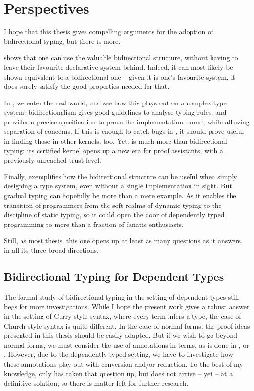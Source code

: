 \chapter{Perspectives}
\label{chap:future-work}

I hope that this thesis gives compelling arguments for the adoption of bidirectional typing,
but there is more.

 shows that one can use the valuable bidirectional structure,
without having to  leave their favourite declarative
system behind. Indeed, it can most likely  be shown equivalent to a bidirectional one
– given it is one’s favourite system, it does surely satisfy the good properties
needed for that.

In , we enter the real world, and see how this plays out
on a complex type system: bidirectionalism gives good guidelines to analyse
typing rules, and provides a precise specification to prove the implementation sound,
while allowing separation of concerns. If this is enough
to catch bugs in , it should prove useful in finding those in other kernels, too.
Yet,  is much more than bidirectional typing: its certified kernel opens
up a new era for proof assistants, with a previously unreached trust level.

Finally,
 exemplifies how the bidirectional structure can be useful when
simply designing a type system, even without a single implementation in sight.
But gradual typing can hopefully be more than a mere
example. As it enables the transition of programmers from the soft realms of
dynamic typing to the discipline of static typing, so it could open the door of
dependently typed programming to more than a fraction of fanatic enthusiasts.

Still, as most thesis, this one opens up at least as many questions as it answers,
in all its three broad directions.

\section{Bidirectional Typing for Dependent Types}

The formal study of bidirectional typing in the setting of dependent types still begs for
more investigations. While I hope the present work gives a robust answer in the setting
of Curry-style syntax, where every term infers a type,
the case of Church-style syntax is quite different. In the case of normal forms,
the proof ideas presented in this thesis should be easily adapted.
But if we wish to go beyond normal forms, we must consider the use of annotations in terms,
as is done in \eg {},  or
.
However, due to the dependently-typed
setting, we have to investigate how these annotations play out with conversion and/or reduction.
To the best of my knowledge, only \citeauthor{McBride2022} has taken that question up,
but does not arrive – yet – at a definitive solution, so there is
matter left for further research.

